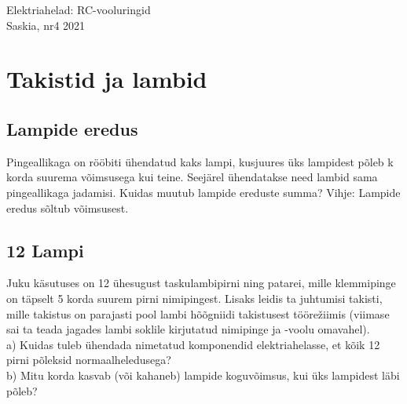 \documentclass{article}
\begin{document}
\twocolumn
{\huge Elektriahelad: RC-vooluringid}\\
{\Large Saskia, nr4 2021}\\
\section{Takistid ja lambid}
\subsection{Lampide eredus}
Pingeallikaga on rööbiti ühendatud kaks lampi, kusjuures üks lampidest põleb
k korda suurema võimsusega kui teine. Seejärel ühendatakse need lambid sama
pingeallikaga jadamisi. Kuidas muutub lampide ereduste summa? Vihje: Lampide eredus sõltub võimsusest.
\subsection{12 Lampi}
Juku käsutuses on 12 ühesugust taskulambipirni ning patarei, mille klemmipinge on täpselt 5 korda suurem pirni nimipingest. Lisaks leidis ta juhtumisi takisti,
mille takistus on parajasti pool lambi hõõgniidi takistusest töörežiimis (viimase
sai ta teada jagades lambi soklile kirjutatud nimipinge ja -voolu omavahel).\\
a) Kuidas tuleb ühendada nimetatud komponendid elektriahelasse, et kõik 12 pirni põleksid normaalheledusega?\\
b) Mitu korda kasvab (või kahaneb) lampide koguvõimsus, kui üks lampidest läbi
põleb?
\end{document}
